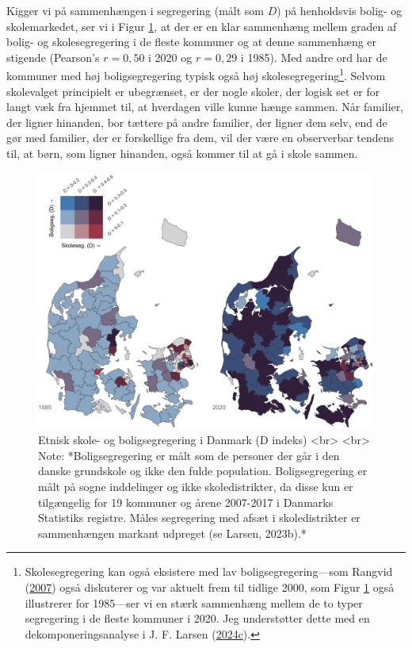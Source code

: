 \documentclass[
]{book}
\begin{document}
Kigger vi på sammenhængen i segregering (målt som \(D\)) på henholdsvis bolig- og skolemarkedet, ser vi i Figur \ref{fig:fig-3-4}, at der er en klar sammenhæng mellem graden af bolig- og skolesegregering i de fleste kommuner og at denne sammenhæng er stigende (Pearson's \(r=0,50\) i 2020 og \(r=0,29\) i 1985). Med andre ord har de kommuner med høj boligsegregering typisk også høj skolesegregering\footnote{Skolesegregering kan også eksistere med lav boligsegregering---som Rangvid (\protect\hyperlink{ref-rangvid2007}{2007}) også diskuterer og var aktuelt frem til tidlige 2000, som Figur \ref{fig:fig-3-4} også illustrerer for 1985---ser vi en stærk sammenhæng mellem de to typer segregering i de fleste kommuner i 2020. Jeg understøtter dette med en dekomponeringsanalyse i J. F. Larsen (\protect\hyperlink{ref-larsen2024b}{2024c}).}. Selvom skolevalget principielt er ubegrænset, er der nogle skoler, der logisk set er for langt væk fra hjemmet til, at hverdagen ville kunne hænge sammen. Når familier, der ligner hinanden, bor tættere på andre familier, der ligner dem selv, end de gør med familier, der er forskellige fra dem, vil der være en observerbar tendens til, at børn, som ligner hinanden, også kommer til at gå i skole sammen.

\begin{figure}
\includegraphics[width=1\linewidth]{images/Figur5} \caption{Etnisk skole- og boligsegregering i Danmark (D indeks) <br> <br> Note: *Boligsegregering er målt som de personer der går i den danske grundskole og ikke den fulde population. Boligsegregering er målt på sogne inddelinger og ikke skoledistrikter, da disse kun er tilgængelig for 19 kommuner og årene 2007-2017 i Danmarks Statistiks registre. Måles segregering med afsæt i skoledistrikter er sammenhængen markant udpreget (se Larsen, 2023b).*}\label{fig:fig-3-4}
\end{figure}
\end{document}
